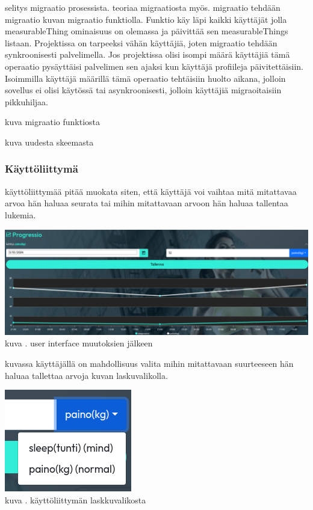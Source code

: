 \documentclass[11pt,a4paper,titlepage,oneside]{article}
\begin{document}
selitys migraatio prosessista. teoriaa migraatiosta myös.
migraatio tehdään migraatio kuvan \nextImageCount {} migraatio funktiolla. 
Funktio käy läpi kaikki käyttäjät jolla measurableThing ominaisuus on olemassa ja päivittää sen measurableThings listaan.
Projektissa on tarpeeksi vähän käyttäjiä, joten migraatio tehdään synkroonisesti palvelimella. 
Jos projektissa olisi isompi määrä käyttäjiä tämä operaatio pysäyttäisi palvelimen sen ajaksi kun käyttäjä profiileja päivitettäisiin.
Isoimmilla käyttäjä määrillä tämä operaatio tehtäisiin huolto aikana, jolloin sovellus ei olisi käytössä tai asynkroonisesti, 
jolloin käyttäjiä migraoitaisiin pikkuhiljaa.


\bigskip

kuva migraatio funktiosta
\medskip

\bigskip


kuva uudesta skeemasta
\medskip


\subsubsection{Käyttöliittymä}

käyttöliittymää pitää muokata siten, että käyttäjä voi vaihtaa mitä mitattavaa arvoa hän haluaa seurata tai mihin mitattavaan arvoon hän haluaa tallentaa lukemia.
\bigskip


\includegraphics[width = 15cm]{src/public/progressmulti.png}\\
kuva \getImgCount {}. user interface muutoksien jälkeen
\medskip

kuvassa käyttäjällä on mahdollisuus valita mihin mitattavaan suurteeseen hän haluaa tallettaa arvoja kuvan \nextImageCount{} laskuvalikolla.
\bigskip

\includegraphics{src/public/progressselect.png}\\
kuva \getImgCount {}. käyttöliittymän laskkuvalikosta
\medskip
\end{document}
